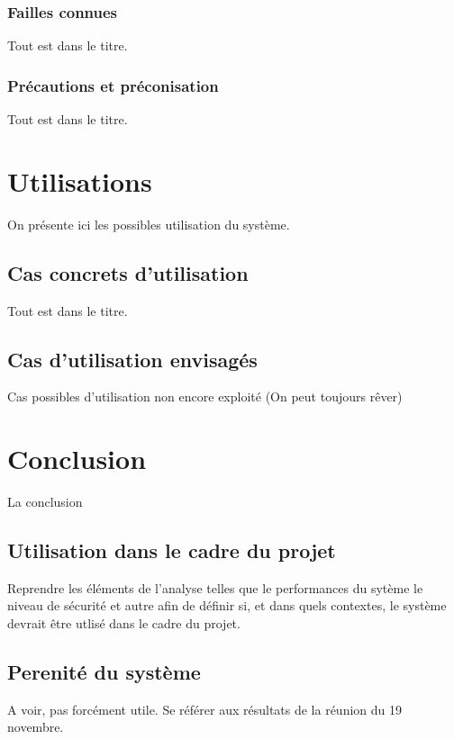 \documentclass[10pt]{article}
\begin{document}
    \subsubsection{Failles connues}
    Tout est dans le titre.
    
    \subsubsection{Précautions et préconisation}
    Tout est dans le titre.
    
\section{Utilisations}
On présente ici les possibles utilisation du système.
  \subsection{Cas concrets d'utilisation}
  Tout est dans le titre.
  
  \subsection{Cas d'utilisation envisagés}
  Cas possibles d'utilisation non encore exploité (On peut toujours r\^ever)
  
\section{Conclusion}
La conclusion
  \subsection{Utilisation dans le cadre du projet}
  Reprendre les éléments de l'analyse telles que le performances du sytème le niveau de sécurité et autre afin de définir si, et dans quels contextes, le système devrait
  \^etre utlisé dans le cadre du projet.
  
  \subsection{Perenité du système}
  A voir, pas forcément utile. Se référer aux résultats de la réunion du 19 novembre.
    
\end{document}
